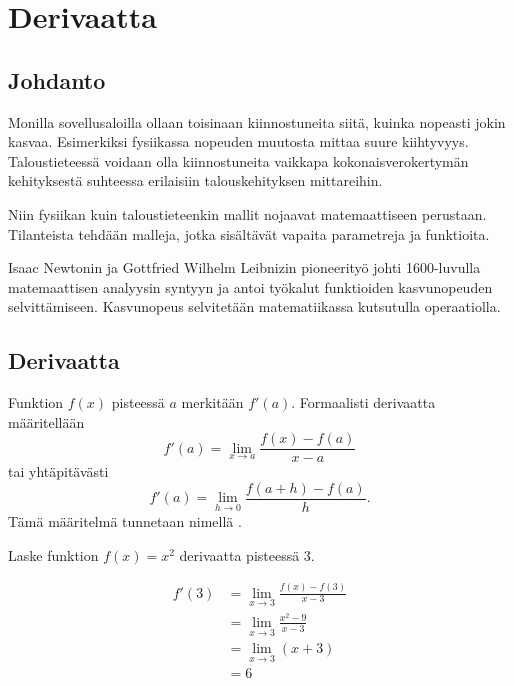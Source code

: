 \chapter{Derivaatta}

\section{Johdanto}


Monilla sovellusaloilla ollaan toisinaan kiinnostuneita siitä, kuinka nopeasti jokin kasvaa.
Esimerkiksi fysiikassa nopeuden muutosta mittaa suure kiihtyvyys. Taloustieteessä voidaan olla
kiinnostuneita vaikkapa kokonaisverokertymän kehityksestä suhteessa erilaisiin talouskehityksen mittareihin.

Niin fysiikan kuin taloustieteenkin mallit nojaavat matemaattiseen perustaan.
Tilanteista tehdään malleja, jotka sisältävät vapaita parametreja ja funktioita.

Isaac Newtonin ja Gottfried Wilhelm Leibnizin pioneerityö johti 1600-luvulla
matemaattisen analyysin syntyyn ja antoi työkalut funktioiden kasvunopeuden selvittämiseen.
Kasvunopeus selvitetään matematiikassa  kutsutulla operaatiolla.

\section{Derivaatta}

Funktion $f(x)$  pisteessä $a$ merkitään $f'(a)$.
Formaalisti derivaatta määritellään
\[ f'(a) = \lim\limits_{x \to a} \frac{f(x)-f(a)}{x-a} \]
tai yhtäpitävästi
\[ f'(a) = \lim\limits_{h \to 0} \frac{f(a+h)-f(a)}{h}. \]
Tämä määritelmä tunnetaan nimellä .

\begin{esimerkki}
	Laske funktion $f(x) = x^2$ derivaatta pisteessä $3$.
	\begin{esimratk}
		\begin{align*}
			f'(3) &= \lim\limits_{x \to 3} \frac{f(x)-f(3)}{x-3} \\
				  &= \lim\limits_{x \to 3} \frac{x^2-9}{x-3} \\
				  &= \lim\limits_{x \to 3} (x+3) \\
				  &= 6
		\end{align*}
	\end{esimratk}
\end{esimerkki}

